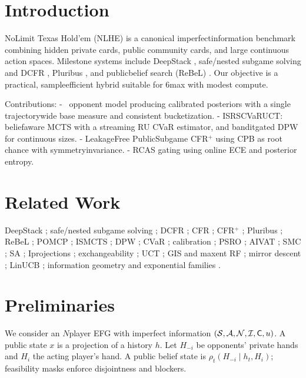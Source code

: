 \section{Introduction}
No\textendash Limit Texas Hold'em (NLHE) is a canonical imperfect\textendash information benchmark combining hidden private cards, public community cards, and large continuous action spaces. Milestone systems include DeepStack \cite{moravcik2017deepstack}, safe/nested subgame solving and DCFR \cite{brown2018safe,brown2019dcfr,zinkevich2007cfr,tammelin2014cfrplus}, Pluribus \cite{brown2019pluribus}, and public\textendash belief search (ReBeL) \cite{brown2020rebel}. Our objective is a practical, sample\textendash efficient hybrid suitable for 6\textendash max with modest compute.

Contributions:
- \sCRF\ opponent model producing calibrated posteriors with a single trajectory\textendash wide base measure and consistent bucketization.
- IS\textendash RS\textendash CVaR\textendash UCT: belief\textendash aware MCTS with a streaming RU CVaR estimator, and bandit\textendash gated DPW for continuous sizes.
- Leakage\textendash Free Public\textendash Subgame CFR$^+$ using CPB as root chance with symmetry\textendash invariance.
- RCAS gating using online ECE and posterior entropy.

\section{Related Work}
DeepStack \cite{moravcik2017deepstack}; safe/nested subgame solving \cite{brown2018safe}; DCFR \cite{brown2019dcfr}; CFR \cite{zinkevich2007cfr}; CFR$^+$ \cite{tammelin2014cfrplus}; Pluribus \cite{brown2019pluribus}; ReBeL \cite{brown2020rebel}; POMCP \cite{silver2010pomcp}; ISMCTS \cite{cowling2012ismcts}; DPW \cite{couetoux2011dpw}; CVaR \cite{rockafellar2000cvar,chow2014cvar,tamar2015cvar}; calibration \cite{guo2017calibration}; PSRO \cite{lanctot2017psro}; AIVAT \cite{burch2018aivat}; SMC \cite{doucet2001smc}; SA \cite{borkar2008sa}; I\textendash projections \cite{csiszar1975i}; exchangeability \cite{diaconis1980finite}; UCT \cite{kocsis2006uct}; GIS and maxent RF \cite{darroch1972gis,dellarfield1997pami}; mirror descent \cite{beck2003mirror}; LinUCB \cite{li2010linucb}; information geometry and exponential families \cite{wainwright2008graphical,amari2016ig}.

\section{Preliminaries}
We consider an $N$\textendash player EFG with imperfect information $(\mathcal{S},\mathcal{A},\mathcal{N},\mathcal{I},\mathsf{C},u)$. A public state $x$ is a projection of a history $h$. Let $H_{-i}$ be opponents’ private hands and $H_i$ the acting player's hand. A public belief state is $\rho_t(H_{-i}\mid h_t,H_i)$; feasibility masks enforce disjointness and blockers.

